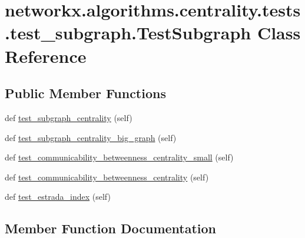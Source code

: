 \hypertarget{classnetworkx_1_1algorithms_1_1centrality_1_1tests_1_1test__subgraph_1_1TestSubgraph}{}\section{networkx.\+algorithms.\+centrality.\+tests.\+test\+\_\+subgraph.\+Test\+Subgraph Class Reference}
\label{classnetworkx_1_1algorithms_1_1centrality_1_1tests_1_1test__subgraph_1_1TestSubgraph}
\subsection*{Public Member Functions}
\begin{DoxyCompactItemize}
\item 
def \hyperlink{classnetworkx_1_1algorithms_1_1centrality_1_1tests_1_1test__subgraph_1_1TestSubgraph_a7282118cd4cf62eedc617d9586fa21f3}{test\+\_\+subgraph\+\_\+centrality} (self)
\item 
def \hyperlink{classnetworkx_1_1algorithms_1_1centrality_1_1tests_1_1test__subgraph_1_1TestSubgraph_a7bedc27522f4bc7a5e46add8603fc38f}{test\+\_\+subgraph\+\_\+centrality\+\_\+big\+\_\+graph} (self)
\item 
def \hyperlink{classnetworkx_1_1algorithms_1_1centrality_1_1tests_1_1test__subgraph_1_1TestSubgraph_a8a4d547f5516829df6f08c2440dd54b9}{test\+\_\+communicability\+\_\+betweenness\+\_\+centrality\+\_\+small} (self)
\item 
def \hyperlink{classnetworkx_1_1algorithms_1_1centrality_1_1tests_1_1test__subgraph_1_1TestSubgraph_afd3d9ef7e1aefc4915af0812536e8e99}{test\+\_\+communicability\+\_\+betweenness\+\_\+centrality} (self)
\item 
def \hyperlink{classnetworkx_1_1algorithms_1_1centrality_1_1tests_1_1test__subgraph_1_1TestSubgraph_a8df1bbf4991ee86605d23e078b6edfb1}{test\+\_\+estrada\+\_\+index} (self)
\end{DoxyCompactItemize}


\subsection{Member Function Documentation}
\mbox{\label{classnetworkx_1_1algorithms_1_1centrality_1_1tests_1_1test__subgraph_1_1TestSubgraph_afd3d9ef7e1aefc4915af0812536e8e99}} 
